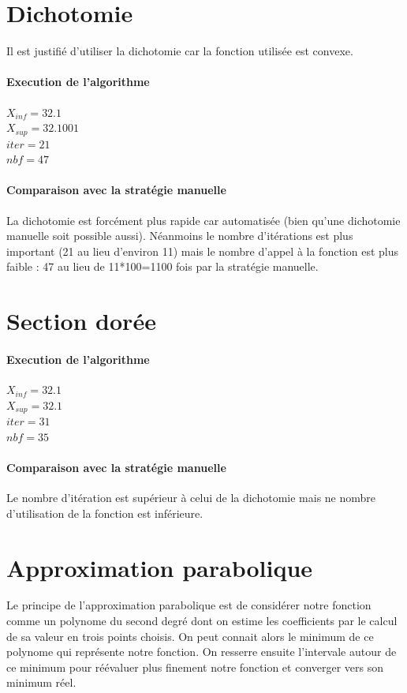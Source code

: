 \documentclass[twocolumn,10pt,a4paper]{article}
\begin{document}
\section{Dichotomie}
Il est justifié d'utiliser la dichotomie car la fonction utilisée est convexe.

\paragraph{Execution de l'algorithme}
$X_{inf}= 32.1$\\
$X_{sup}=32.1001$\\
$iter=21$\\
$nbf=47$
\paragraph{Comparaison avec la stratégie manuelle}
La dichotomie est forcément plus rapide car automatisée (bien qu'une dichotomie manuelle soit possible aussi). Néanmoins le nombre d'itérations est plus important (21 au lieu d'environ 11) mais le nombre d'appel à la fonction est plus faible : 47 au lieu de 11*100=1100 fois par la stratégie manuelle.

\section{Section dorée}
\paragraph{Execution de l'algorithme}
$X_{inf}= 32.1$\\
$X_{sup}=32.1$\\
$iter=31$\\
$nbf=35$

\paragraph{Comparaison avec la stratégie manuelle}
Le nombre d'itération est supérieur à celui de la dichotomie mais ne nombre d'utilisation de la fonction est inférieure.

\section{Approximation parabolique}
Le principe de l'approximation parabolique est de considérer notre fonction comme un polynome du second degré dont on estime les coefficients par le calcul de sa valeur en trois points choisis. On peut connait alors le minimum de ce polynome qui représente notre fonction. On resserre ensuite l'intervale autour de ce minimum pour réévaluer plus finement notre fonction et converger vers son minimum réel.
\end{document}
